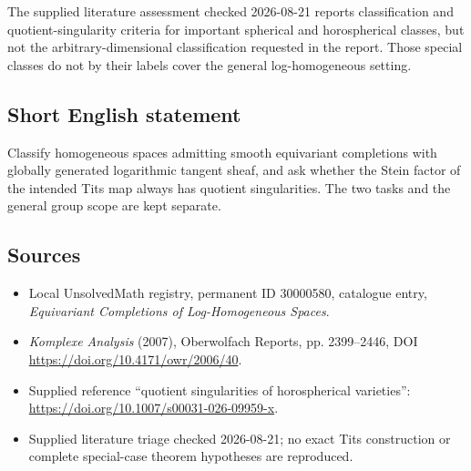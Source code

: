 \documentclass[11pt]{article}
\begin{document}
The supplied literature assessment checked 2026-08-21 reports classification and quotient-singularity criteria for important spherical and horospherical classes, but not the arbitrary-dimensional classification requested in the report. Those special classes do not by their labels cover the general log-homogeneous setting.
\subsection{Short English statement}
Classify homogeneous spaces admitting smooth equivariant completions with globally generated logarithmic tangent sheaf, and ask whether the Stein factor of the intended Tits map always has quotient singularities. The two tasks and the general group scope are kept separate.
\subsection{Sources}
\begin{itemize}
\item Local UnsolvedMath registry, permanent ID 30000580, catalogue entry, \emph{Equivariant Completions of Log-Homogeneous Spaces}.
\item \emph{Komplexe Analysis} (2007), Oberwolfach Reports, pp. 2399--2446, DOI \url{https://doi.org/10.4171/owr/2006/40}.
\item Supplied reference ``quotient singularities of horospherical varieties'': \url{https://doi.org/10.1007/s00031-026-09959-x}.
\item Supplied literature triage checked 2026-08-21; no exact Tits construction or complete special-case theorem hypotheses are reproduced.
\end{itemize}
\end{document}
